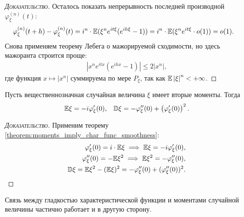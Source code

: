 \documentclass[../main.tex]{subfiles}
\begin{document}
\begin{proof}[\normalfont\textsc{Доказательство}]
 Осталось показать непрерывность последней производной $ \varphi_\xi^{(n)}(t) $:
 \begin{align*}
  \varphi_\xi^{(n)}(t + h) - \varphi_\xi^{(n)}(t) &= i^{n} \cdot \mathbb E(\xi^{n}e^{it\xi}(e^{ih\xi} - 1)) = i^{n} \cdot \mathbb E(\xi^{n}e^{it\xi} \cdot o(1)) = o(1).
 \end{align*} Снова применяем теорему Лебега о мажорируемой сходимости, но здесь мажоранта строится проще:
 \begin{align*}
  \left| x^{n}e^{itx}(e^{ihx} - 1) \right| \leqslant 2 \left| x^{n} \right|,
 \end{align*} где функция $ x \mapsto \left| x^{n} \right| $ суммируема по мере $ P_\xi $, так как $ \mathbb E \left| \xi \right|^{n} < +\infty $.
\end{proof}

\begin{crly}
 Пусть вещественнозначная случайная величина $ \xi $ имеет вторые моменты. Тогда
 \begin{align*}
  \mathbb E\xi = -i \varphi'_\xi(0), &&
  \mathbb D\xi = -\varphi''_\xi(0) + \left( \varphi'_\xi(0) \right)^{2}.
 \end{align*}
\end{crly}
\begin{proof}[\normalfont\textsc{Доказательство}]
 Применим теорему \ref{theorem:moments_imply_char_func_smoothness}:
 \begin{align*}
  \varphi_\xi'(0) = i \cdot \mathbb E\xi \implies \mathbb E\xi = -i \varphi_\xi'(0),\\
  \varphi_\xi''(0) = -\mathbb E\xi^{2} \implies \mathbb E\xi^{2} = -\varphi_\xi''(0),\\
  \mathbb D\xi = \mathbb E\xi^{2}-(\mathbb E\xi)^{2} = -\varphi_\xi''(0) + (\varphi_\xi''(0))^{2}.
 \end{align*}
\end{proof}

Связь между гладкостью характеристической функции и моментами случайной величины частично работает и в другую сторону.
\end{document}
